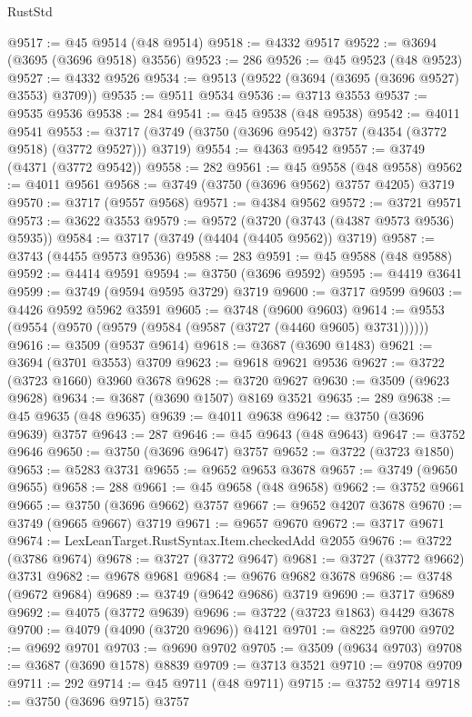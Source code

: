 \begin{lexlean}{RustStd}
\begin{coremodule}
@9517 := @45 @9514 (@48 @9514)
@9518 := @4332 @9517
@9522 := @3694 (@3695 (@3696 @9518) @3556)
@9523 := 286
@9526 := @45 @9523 (@48 @9523)
@9527 := @4332 @9526
@9534 := @9513 (@9522 (@3694 (@3695 (@3696 @9527) @3553) @3709))
@9535 := @9511 @9534
@9536 := @3713 @3553
@9537 := @9535 @9536
@9538 := 284
@9541 := @45 @9538 (@48 @9538)
@9542 := @4011 @9541
@9553 := @3717 (@3749 (@3750 (@3696 @9542) @3757 (@4354 (@3772 @9518) (@3772 @9527))) @3719)
@9554 := @4363 @9542
@9557 := @3749 (@4371 (@3772 @9542))
@9558 := 282
@9561 := @45 @9558 (@48 @9558)
@9562 := @4011 @9561
@9568 := @3749 (@3750 (@3696 @9562) @3757 @4205) @3719
@9570 := @3717 (@9557 @9568)
@9571 := @4384 @9562
@9572 := @3721 @9571
@9573 := @3622 @3553
@9579 := @9572 (@3720 (@3743 (@4387 @9573 @9536) @5935))
@9584 := @3717 (@3749 (@4404 (@4405 @9562)) @3719)
@9587 := @3743 (@4455 @9573 @9536)
@9588 := 283
@9591 := @45 @9588 (@48 @9588)
@9592 := @4414 @9591
@9594 := @3750 (@3696 @9592)
@9595 := @4419 @3641
@9599 := @3749 (@9594 @9595 @3729) @3719
@9600 := @3717 @9599
@9603 := @4426 @9592 @5962 @3591
@9605 := @3748 (@9600 @9603)
@9614 := @9553 (@9554 (@9570 (@9579 (@9584 (@9587 (@3727 (@4460 @9605) @3731))))))
@9616 := @3509 (@9537 @9614)
@9618 := @3687 (@3690 @1483)
@9621 := @3694 (@3701 @3553) @3709
@9623 := @9618 @9621 @9536
@9627 := @3722 (@3723 @1660) @3960 @3678
@9628 := @3720 @9627
@9630 := @3509 (@9623 @9628)
@9634 := @3687 (@3690 @1507) @8169 @3521
@9635 := 289
@9638 := @45 @9635 (@48 @9635)
@9639 := @4011 @9638
@9642 := @3750 (@3696 @9639) @3757
@9643 := 287
@9646 := @45 @9643 (@48 @9643)
@9647 := @3752 @9646
@9650 := @3750 (@3696 @9647) @3757
@9652 := @3722 (@3723 @1850)
@9653 := @5283 @3731
@9655 := @9652 @9653 @3678
@9657 := @3749 (@9650 @9655)
@9658 := 288
@9661 := @45 @9658 (@48 @9658)
@9662 := @3752 @9661
@9665 := @3750 (@3696 @9662) @3757
@9667 := @9652 @4207 @3678
@9670 := @3749 (@9665 @9667) @3719
@9671 := @9657 @9670
@9672 := @3717 @9671
@9674 := LexLeanTarget.RustSyntax.Item.checkedAdd @2055
@9676 := @3722 (@3786 @9674)
@9678 := @3727 (@3772 @9647)
@9681 := @3727 (@3772 @9662) @3731
@9682 := @9678 @9681
@9684 := @9676 @9682 @3678
@9686 := @3748 (@9672 @9684)
@9689 := @3749 (@9642 @9686) @3719
@9690 := @3717 @9689
@9692 := @4075 (@3772 @9639)
@9696 := @3722 (@3723 @1863) @4429 @3678
@9700 := @4079 (@4090 (@3720 @9696)) @4121
@9701 := @8225 @9700
@9702 := @9692 @9701
@9703 := @9690 @9702
@9705 := @3509 (@9634 @9703)
@9708 := @3687 (@3690 @1578) @8839
@9709 := @3713 @3521
@9710 := @9708 @9709
@9711 := 292
@9714 := @45 @9711 (@48 @9711)
@9715 := @3752 @9714
@9718 := @3750 (@3696 @9715) @3757

\end{coremodule}
\end{lexlean}
